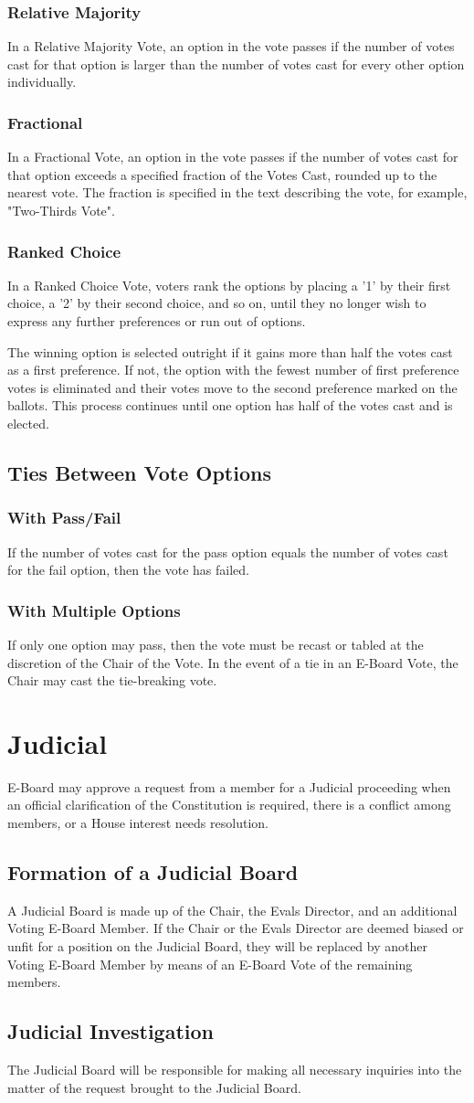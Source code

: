 \documentclass{article}
\newcommand{\article}[1]{\section{#1} \label{#1}}
\newcommand{\asection}[1]{\subsection{#1} \label{#1}}
\newcommand{\asubsection}[1]{\subsubsection{#1} \label{#1}}
\begin{document}
\asubsection{Relative Majority}
In a Relative Majority Vote, an option in the vote passes if the number of votes cast for that option is larger than the number of votes cast for every other option individually.

\asubsection{Fractional}
In a Fractional Vote, an option in the vote passes if the number of votes cast for that option exceeds a specified fraction of the Votes Cast, rounded up to the nearest vote.
The fraction is specified in the text describing the vote, for example, "Two-Thirds Vote".

\asubsection{Ranked Choice}
In a Ranked Choice Vote, voters rank the options by placing a '1' by their first choice, a '2' by their second choice, and so on, until they no longer wish to express any further preferences or run out of options.

The winning option is selected outright if it gains more than half the votes cast as a first preference.
If not, the option with the fewest number of first preference votes is eliminated and their votes move to the second preference marked on the ballots.
This process continues until one option has half of the votes cast and is elected.

\asection{Ties Between Vote Options}

\asubsection{With Pass/Fail}
If the number of votes cast for the pass option equals the number of votes cast for the fail option, then the vote has failed.

\asubsection{With Multiple Options}
If only one option may pass, then the vote must be recast or tabled at the discretion of the Chair of the Vote.
In the event of a tie in an E-Board Vote, the Chair may cast the tie-breaking vote.

\article{Judicial}
E-Board may approve a request from a member for a Judicial proceeding when an official clarification of the Constitution is required, there is a conflict among members, or a House interest needs resolution.

\asection{Formation of a Judicial Board}
A Judicial Board is made up of the Chair, the Evals Director, and an additional Voting E-Board Member.
If the Chair or the Evals Director are deemed biased or unfit for a position on the Judicial Board, they will be replaced by another Voting E-Board Member by means of an E-Board Vote of the remaining members.

\asection{Judicial Investigation}
The Judicial Board will be responsible for making all necessary inquiries into the matter of the request brought to the Judicial Board.
\end{document}
